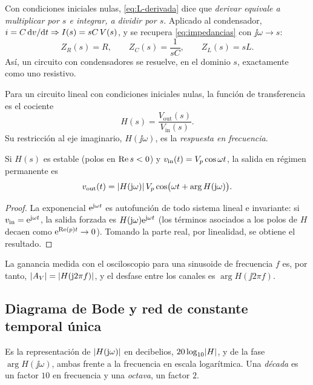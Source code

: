 Con condiciones iniciales nulas, \cref{eq:L-derivada} dice que \emph{derivar equivale a
multiplicar por $s$ e integrar, a dividir por $s$}. Aplicado al condensador,
$i=C\,\mathrm{d} v/\mathrm{d} t\Rightarrow I(s)=sC\,V(s)$, y se recupera \cref{eq:impedancias} con $\jj\omega\to s$:
\begin{equation}\label{eq:Zs}
  Z_R(s)=R,\qquad Z_C(s)=\frac{1}{sC},\qquad Z_L(s)=sL .
\end{equation}
Así, un circuito con condensadores se resuelve, en el dominio $s$, exactamente como uno resistivo.

\begin{definicion}\label{def:transferencia}
Para un circuito lineal con condiciones iniciales nulas, la función de transferencia es el cociente
\begin{equation}\label{eq:transferencia}
  H(s)=\frac{V_{\mathrm{out}}(s)}{V_{\mathrm{in}}(s)} .
\end{equation}
Su restricción al eje imaginario, $H(\jj\omega)$, es la \emph{respuesta en frecuencia}.
\end{definicion}

\begin{proposicion}\label{prop:sinusoide}
Si $H(s)$ es estable (polos en $\operatorname{Re} s<0$) y $v_{\mathrm{in}}(t)=V_p\cos\omega t$, la salida en régimen
permanente es
\begin{equation}\label{eq:respuesta-sinusoide}
  v_{\mathrm{out}}(t)=\lvert H(\mathrm{j}\omega)\rvert\,V_p\cos\bigl(\omega t+\arg H(\mathrm{j}\omega)\bigr).
\end{equation}
\end{proposicion}
\begin{proof}
La exponencial $\mathrm{e}^{\mathrm{j}\omega t}$ es autofunción de todo sistema lineal e invariante: si
$v_{\mathrm{in}}=\mathrm{e}^{\mathrm{j}\omega t}$, la salida forzada es $H(\mathrm{j}\omega)\mathrm{e}^{\mathrm{j}\omega t}$ (los términos asociados a los
polos de $H$ decaen como $\mathrm{e}^{\operatorname{Re}(p)t}\to0$). Tomando la parte real, por linealidad, se obtiene el
resultado.
\end{proof}
La ganancia medida con el osciloscopio para una sinusoide de frecuencia $f$ es, por tanto,
$\lvert A_V\rvert=\lvert H(\mathrm{j} 2\pi f)\rvert$, y el desfase entre los canales es $\arg H(\jj2\pi f)$.

\subsection{Diagrama de Bode y red de constante temporal única}\label{sec:bode}
\begin{definicion}\label{def:bode}
Es la representación de $\lvert H(\mathrm{j}\omega)\rvert$ en decibelios, $20\log_{10}\lvert H\rvert$, y de la fase
$\arg H(\jj\omega)$, ambas frente a la frecuencia en escala logarítmica. Una \emph{década} es un
factor $10$ en frecuencia y una \emph{octava}, un factor $2$.
\end{definicion}

